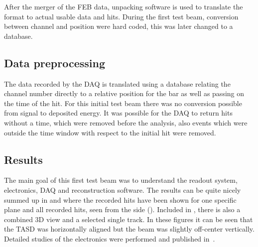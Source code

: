 After the merger of the FEB data, unpacking software is used to translate the format to actual usable data and hits. During the first test beam, conversion between channel and position were hard coded, this was later changed to a database.  


\subsection{Data preprocessing}

The data recorded by the DAQ is translated using a database relating the channel number directly to a relative position for the bar as well as passing on the time of the hit. For this initial test beam there was no conversion possible from signal to deposited energy. It was possible for the DAQ to return hits without a time, which were removed before the analysis, also events which were outside the time window with respect to the initial hit were removed.

\subsection{Results}

The main goal of this first test beam was to understand the readout system, electronics, DAQ and reconstruction software. The results can be quite nicely summed up in  and  where the recorded hits have been shown for one specific plane and all recorded hits, seen from the side (). Included in , there is also a combined 3D view and a selected single track. In these figures it can be seen that the TASD was horizontally aligned but the beam was slightly off-center vertically. Detailed studies of the electronics were performed and published in~\cite{52Georgi}.

